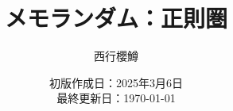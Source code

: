 \newcommand{\CATEGORY}{メモランダム}%
\newcommand{\TITLE}{正則圏}
\newcommand{\AUTHORNAME}{西行櫻鱒}
\newcommand{\CREATEDAT}{2025年3月6日}

\title{\CATEGORY：\TITLE}
\author{\AUTHORNAME}
\date{初版作成日：\CREATEDAT\\最終更新日：\today\\}


